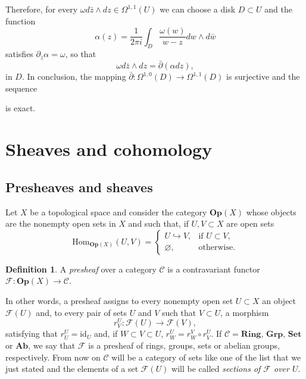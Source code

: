 \documentclass[12pt,a4paper]{book}
\theoremstyle{definition} \newtheorem{defn}[thm]{Definition}
\theoremstyle{definition} \newtheorem{ejemplo}[thm]{Example}
\theoremstyle{definition} \newtheorem{ejercicio}[thm]{Exercise}
\theoremstyle{remark} \newtheorem*{obs}{Remark}
\def\id{\mathrm{id}}
\def\FF{\mathscr{F}}
\newcommand{\ve}[1]{\mathbf{#1}}
\begin{document}
Therefore, for every $\omega d\bar{z}\wedge dz \in \Omega^{1,1}(U)$ we can choose a disk $D \subset U$ and the function
  \begin{equation*}
    \alpha(z) = \frac{1}{2\pi i}\int_D \frac{\omega(w)}{w-z} dw \wedge d\bar{w}
  \end{equation*}
  satisfies $\partial_{\bar{z}} \alpha = \omega$, so that
  \begin{equation*}
    \omega d\bar{z}\wedge dz = \bar{\partial}(\alpha dz),
  \end{equation*}
  in $D$. In conclusion, the mapping $\bar{\partial}:\Omega^{1,0}(D) \rightarrow \Omega^{1,1}(D)$ is surjective and the sequence
  \begin{center}
  \end{center}
  is exact.

    \section{Sheaves and cohomology}
    \subsection{Presheaves and sheaves}
    Let $X$ be a topological space and consider the category $\ve{Op}(X)$ whose objects are the nonempty open sets in $X$ and such that, if $U, V \subset X$ are open sets
    \begin{equation*}
      \mathrm{Hom}_{\ve{Op}(X)}(U,V)=
      \begin{cases}
	U \hookrightarrow V, & \text{if } U\subset V, \\
	\varnothing, & \text{otherwise.}
      \end{cases}
    \end{equation*}
    \begin{defn}
      A \emph{presheaf} over a category $\mathcal{C}$ is a contravariant functor $\mathscr{F}: \ve{Op}(X) \rightarrow \mathcal{C}$. 
    \end{defn}
    In other words, a presheaf assigns to every nonempty open set $U\subset X$ an object $\mathscr{F}(U)$ and, to every pair of sets $U$ and $V$ such that $V\subset U$, a morphism 
    \begin{equation*}
      r^U_V: \mathscr{F}(U) \rightarrow \FF(V),
    \end{equation*}
    satisfying that $r^U_U = \id_U$ and, if $W\subset V \subset U$, $r^U_W= r^V_W \circ r^U_V$. If $\mathcal{C}=\ve{Ring}$, $\ve{Grp}$, $\ve{Set}$ or $\ve{Ab}$, we say that $\FF$ is a presheaf of rings, groups, sets or abelian groups, respectively. From now on $\mathcal{C}$ will be a category of sets like one of the list that we just stated and the elements of a set $\FF(U)$ will be called \emph{sections of $\FF$ over $U$}.
\end{document}
